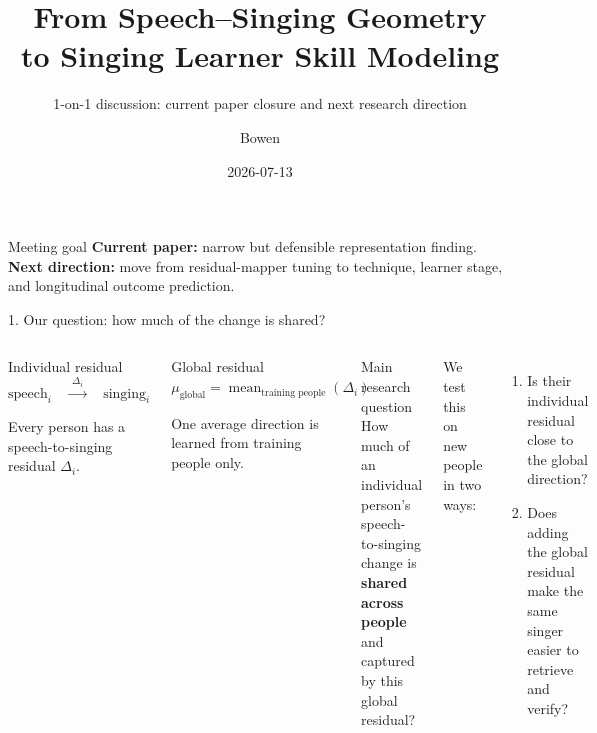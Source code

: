\documentclass[aspectratio=169,10pt]{ctexbeamer}
\title{From Speech--Singing Geometry\\to Singing Learner Skill Modeling}
\subtitle{1-on-1 discussion: current paper closure and next research direction}
\author{Bowen}
\date{2026-07-13}
\begin{document}
\begin{frame}[plain]
  \vspace{0.6cm}
  {\color{Navy}\LARGE\inserttitle\par}
  \vspace{0.35cm}
  {\large\color{Muted}\insertsubtitle\par}
  \vfill
  \begin{block}{Meeting goal}
  \large
  \textbf{Current paper:} narrow but defensible representation finding.\\[0.15cm]
  \textbf{Next direction:} move from residual-mapper tuning to technique, learner stage, and longitudinal outcome prediction.
  \end{block}
  \vfill
  {\color{Muted}\insertauthor\hfill\insertdate}
\end{frame}

\begin{frame}{1. Our question: how much of the change is shared?}
\begin{columns}[T,onlytextwidth]
\begin{block}{Individual residual}
\centering
\large
$\text{speech}_i\quad\xrightarrow{\ \Delta_i\ }\quad\text{singing}_i$

\vspace{0.25cm}
\small
Every person has a speech-to-singing residual $\Delta_i$.
\end{block}

\begin{block}{Global residual}
\centering
\large
$\mu_{\mathrm{global}}=\operatorname{mean}_{\text{training people}}(\Delta_i)$

\vspace{0.2cm}
\small
One average direction is learned from training people only.
\end{block}

\begin{block}{Main research question}
\large
How much of an individual person's speech-to-singing change is \textbf{shared across people} and captured by this global residual?
\end{block}

\small
We test this on new people in two ways:
\begin{enumerate}
  \item Is their individual residual close to the global direction?
  \item Does adding the global residual make the same singer easier to retrieve and verify?
\end{enumerate}
\end{columns}
\end{frame}
\end{document}
